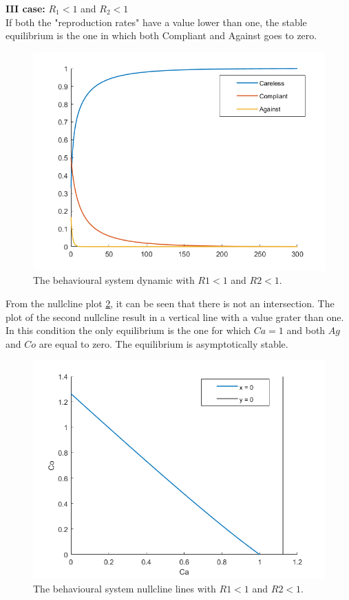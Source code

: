 \textbf{III case:} $R_1 <1$ and $R_2<1$ \\
If both the "reproduction rates" have a value lower than one, the stable equilibrium is the one in which both Compliant and Against goes to zero. 

\begin{figure}[h]
	\centering
	\includegraphics[width=0.7\linewidth]{figure/behavioural_equilibrium/r1r2less1_dyn}
	\caption[Behavioural third second case]{The behavioural system dynamic with $R1 < 1$ and $R2 < 1$.}
	\label{fig:r1r2less1dyn}
\end{figure}
From the nullcline plot \ref{fig:r1r2less1nullcline}, it can be seen that there is not an intersection. The plot of the second nullcline result in a vertical line with a value grater than one. In this condition the only equilibrium is the one for which $Ca = 1$ and both $Ag$ and $Co$ are equal to zero. 
The equilibrium is asymptotically stable. 
\begin{figure}[h]
	\centering
	\includegraphics[width=0.7\linewidth]{figure/behavioural_equilibrium/r1r2less1_nullcline}
	\caption[Behavioural nullcline third case]{The behavioural system nullcline lines with $R1 < 1$ and $R2 < 1$.}
	\label{fig:r1r2less1nullcline}
\end{figure}

